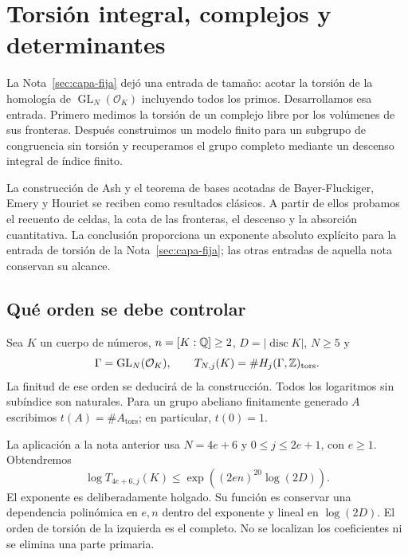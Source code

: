 \section{Torsión integral, complejos y determinantes}
\label{sec:torsion-integral}

La Nota~\ref{sec:capa-fija} dejó una entrada de tamaño: acotar la
torsión de la homología de $\operatorname{GL}_N(\mathcal O_K)$
incluyendo todos los primos. Desarrollamos esa entrada. Primero
medimos la torsión de un complejo libre por los volúmenes de sus
fronteras. Después construimos un modelo finito para un subgrupo
de congruencia sin torsión y recuperamos el grupo completo mediante
un descenso integral de índice finito.

La construcción de Ash y el teorema de bases acotadas de
Bayer-Fluckiger, Emery y Houriet se reciben como resultados clásicos.
A partir de ellos probamos el recuento de celdas, la cota de las
fronteras, el descenso y la absorción cuantitativa. La conclusión
proporciona un exponente absoluto explícito para la entrada de
torsión de la Nota~\ref{sec:capa-fija}; las otras entradas de aquella
nota conservan su alcance.


\subsection{Qué orden se debe controlar}

Sea $K$ un cuerpo de números, $n=[K:\mathbb{Q}]\ge2$,
$D=|\operatorname{disc}K|$, $N\ge5$ y
\[
 \Gamma=\operatorname{GL}_N(\mathcal O_K),\qquad
 T_{N,j}(K)=\#H_j(\Gamma,\mathbb{Z})_{\mathrm{tors}}.
\]
La finitud de ese orden se deducirá de la construcción.
Todos los logaritmos sin subíndice son naturales.
Para un grupo abeliano finitamente generado $A$ escribimos
$t(A)=\#A_{\mathrm{tors}}$; en particular, $t(0)=1$.

La aplicación a la nota anterior usa $N=4e+6$ y
$0\le j\le2e+1$, con $e\ge1$. Obtendremos
\begin{equation}
 \log T_{4e+6,j}(K)
 \le \exp\!\left((2en)^{20}\log(2D)\right).
 \label{eq:ti-objetivo}
\end{equation}
El exponente es deliberadamente holgado. Su función es conservar
una dependencia polinómica en $e,n$ dentro del exponente y lineal
en $\log(2D)$. El orden de torsión de la izquierda es el completo.
No se localizan los coeficientes ni se elimina una parte primaria.

